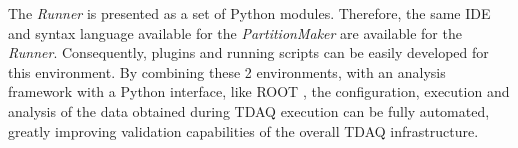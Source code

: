 The \emph{Runner} is presented as a set of Python modules. Therefore, the same IDE and syntax language available for the \emph{PartitionMaker} are available for the \emph{Runner}.  Consequently, plugins and running scripts can be easily developed for this environment. By combining these 2 environments, with an analysis framework with a Python interface, like ROOT \cite{bib:root}, the configuration, execution and analysis of the data obtained during TDAQ execution can be fully automated, greatly improving validation capabilities of the overall TDAQ infrastructure.



